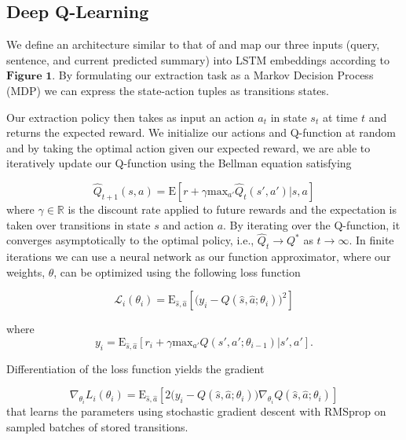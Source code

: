 \documentclass[12pt]{article}
\begin{document}
\subsection{Deep Q-Learning}

We define an architecture similar to that of \cite{narasimhan2015language} and map our three inputs (query, sentence, and current predicted summary) into LSTM embeddings according to $\textbf{Figure 1}$. By formulating our extraction task as a Markov Decision Process (MDP) we can express the state-action tuples as transitions states. 

Our extraction policy then takes as input an action $a_t$ in state $s_t$ at time $t$ and returns the expected reward. We initialize our actions and Q-function at random and by taking the optimal action given our expected reward, we are able to iteratively update our Q-function using the Bellman equation \cite{sutton1998reinforcement} satisfying

\begin{equation}
	\hat{Q}_{t+1}(s,a) = \textrm{E}[ r + \gamma \textrm{max}_{a'} \hat{Q}_t(s', a') | s, a]
\end{equation}
where $\gamma \in \mathbb{R}$ is the discount rate applied to future rewards and the expectation is taken over transitions in state $s$ and action $a$. By iterating over the Q-function, it converges asymptotically to the optimal policy, i.e.,  $\hat{Q}_t \rightarrow Q^{*}$ as $t \rightarrow \infty$. In finite iterations we can use a neural network as our function approximator, where our weights, $\theta$, can be optimized using the following loss function

\begin{equation}
	\mathcal{L}_i(\theta_i) =  \textrm{E}_{\hat{s}, \hat{a}}[ \big (y_i - Q(\hat{s}, \hat{a}; \theta_i) \big )^2]
\end{equation}

where 
\begin{equation}
	y_i = \textrm{E}_{\hat{s}, \hat{a}}[ r_i + \gamma \textrm{max}_{a'} Q(s', a' ; \theta_{i-1}) | s', a' ].
\end{equation}

Differentiation of the loss function yields the gradient

\begin{equation}
	\nabla_{\theta_i} L_i(\theta_i) = \textrm{E}_{\hat{s}, \hat{a}}[ 2  \big (y_i - Q(\hat{s}, \hat{a}; \theta_i) \big ) \nabla_{\theta_{i}}  Q(\hat{s}, \hat{a}; \theta_i)]
\end{equation}
that learns the parameters using stochastic gradient descent with RMSprop \cite{hinton2012lecture} on sampled batches of stored transitions.
\end{document}
